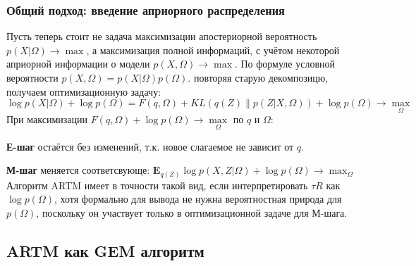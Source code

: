 \documentclass[12pt]{article}
\begin{document}
\subsubsection{Общий подход: введение априорного распределения}
Пусть теперь стоит не задача максимизации апостериорной вероятность $p(X|\Omega) \to \max$, а максимизация полной информаций, с учётом некоторой априорной информации о модели $p(X, \Omega) \to \max$. По формуле условной вероятности $p(X, \Omega) = p(X|\Omega) p(\Omega)$. повторяя старую декомпозицю, получаем оптимизационную задачу:
\[
\log p(X|\Omega) + \log p(\Omega) = F(q, \Omega) + KL(q(Z)\|p(Z|X,\Omega)) + \log p(\Omega) \to \max\limits_{\Omega}
\]
При максимизации $ F(q, \Omega) + \log p(\Omega) \to \max\limits_{\Omega}$ по $q$ и $\Omega$:

\textbf{Е-шаг} остаётся без изменений, т.к. новое слагаемое не зависит от $q$.

\textbf{М-шаг} меняется соответсвующе: $\mathbf{E}_{q(Z)} \log p(X, Z|\Omega) + \log p(\Omega)\to \max_{\Omega}$\\
Алгоритм ARTM имеет в точности такой вид, если интерпретировать $\tau R$ как $\log p(\Omega)$, хотя формально для вывода не нужна вероятностная природа для $p(\Omega)$, поскольку он участвует только в оптимизационной задаче для М-шага.
	\subsection{ARTM как GEM алгоритм}
\label{subsec:artmasgem}
\end{document}
